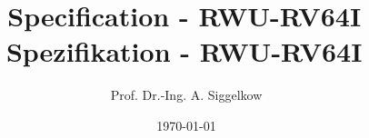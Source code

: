 \documentclass[a4paper,12pt]{book}
\newcommand{\TEXTa}{./}
\newcommand{\aschip}{\textbf{RWU-RV64I}\,}
\begin{document}
{\title{Specification - \aschip}}
{\title{Spezifikation - \aschip}}
\author{Prof. Dr.-Ing. A. Siggelkow}
\date{\today}
\begin{titlepage}
  \maketitle
  \thispagestyle{empty}
\end{titlepage}
\thispagestyle{empty}
\newpage
\setcounter{chapter}{0}
%

\printbibliography
\end{document}
